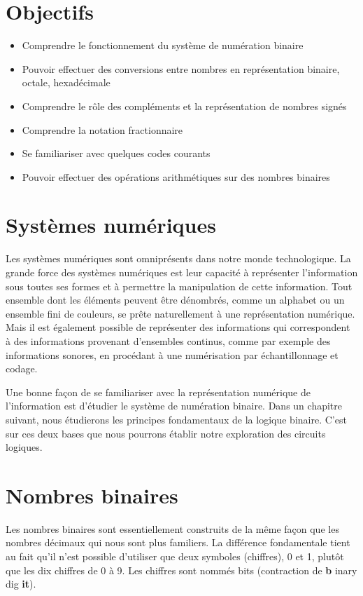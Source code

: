 \documentclass[letter, oneside]{book}
\begin{document}
\section{Objectifs}
\label{sec:org5aafb35}

\begin{itemize}
\item Comprendre le fonctionnement du système de numération binaire
\item Pouvoir effectuer des conversions entre nombres en représentation
binaire, octale, hexadécimale
\item Comprendre le rôle des compléments et la représentation de nombres signés
\item Comprendre la notation fractionnaire
\item Se familiariser avec quelques codes courants
\item Pouvoir effectuer des opérations arithmétiques sur des nombres binaires
\end{itemize}

\section{Systèmes numériques}
\label{sec:org4a83e6f}

Les systèmes numériques sont omniprésents dans notre monde
technologique. La grande force des systèmes numériques est leur
capacité à représenter l'information sous toutes ses formes et à
permettre la manipulation de cette information. Tout ensemble dont les
éléments peuvent être dénombrés, comme un alphabet ou un ensemble fini
de couleurs, se prête naturellement à une représentation
numérique. Mais il est également possible de représenter des
informations qui correspondent à des informations provenant
d'ensembles continus, comme par exemple des informations sonores, en
procédant à une numérisation par échantillonnage et codage. 

Une bonne façon de se familiariser avec la représentation numérique de
l'information est d'étudier le système de numération binaire. Dans un
chapitre suivant, nous étudierons les principes fondamentaux de la
logique binaire. C'est sur ces deux bases que nous pourrons établir
notre exploration des circuits logiques.

\section{Nombres binaires}
\label{sec:org4b9f68a}

Les nombres binaires sont essentiellement construits de la même façon
que les nombres décimaux qui nous sont plus familiers. La
différence fondamentale tient au fait qu'il n'est possible d'utiliser
que deux symboles (chiffres), 0 et 1, plutôt que les dix chiffres de 0
à 9. Les chiffres sont nommés bits (contraction de \textbf{b} inary dig
\textbf{it}).
\end{document}
